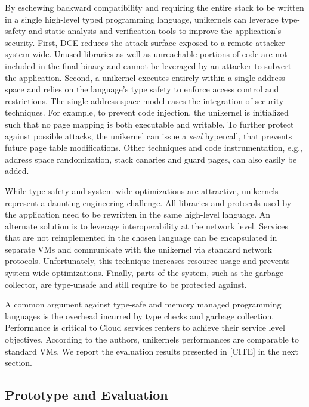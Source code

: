 By eschewing backward compatibility and requiring the entire stack to be written in a single high-level typed programming language, unikernels can leverage type-safety and static analysis and verification tools to improve the application's security.
First, DCE reduces the attack surface exposed to a remote attacker system-wide.
Unused libraries as well as unreachable portions of code are not included in the final binary and cannot be leveraged by an attacker to subvert the application.
Second, a unikernel executes entirely within a single address space and relies on the language's type safety to enforce access control and restrictions.
The single-address space model eases the integration of security techniques. 
For example, to prevent code injection, the unikernel is initialized such that no page mapping is both executable and writable.
To further protect against possible attacks, the unikernel can issue a \emph{seal} hypercall, that prevents future page table modifications.
Other techniques and code instrumentation, e.g., address space randomization, stack canaries and guard pages, can also easily be added.

While type safety and system-wide optimizations are attractive, unikernels represent a daunting engineering challenge.
All libraries and protocols used by the application need to be rewritten in the same high-level language.
An alternate solution is to leverage interoperability at the network level.
Services that are not reimplemented in the chosen language can be encapsulated in separate VMs and communicate with the unikernel via standard network protocols.
Unfortunately, this technique increases resource usage and prevents system-wide optimizations.
Finally, parts of the system, such as the garbage collector, are type-unsafe and still require to be protected against. 

A common argument against type-safe and memory managed programming languages is the overhead incurred by type checks and garbage collection.
Performance is critical to Cloud services renters to achieve their service level objectives.
According to the authors, unikernels performances are comparable to standard VMs.
We report the evaluation results presented in [CITE] in the next section.

\subsection{Prototype and Evaluation}
%
%

